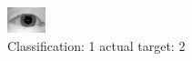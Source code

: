 \begin{figure}[h!]
\begin{center}
\includegraphics[width=0.60\columnwidth]{figures/ID966_class_1_target_2.png}
\end{center}
\caption{ Classification: 1 actual target: 2}
\label{fig:ID966_class_1_target_2}
\end{figure}
